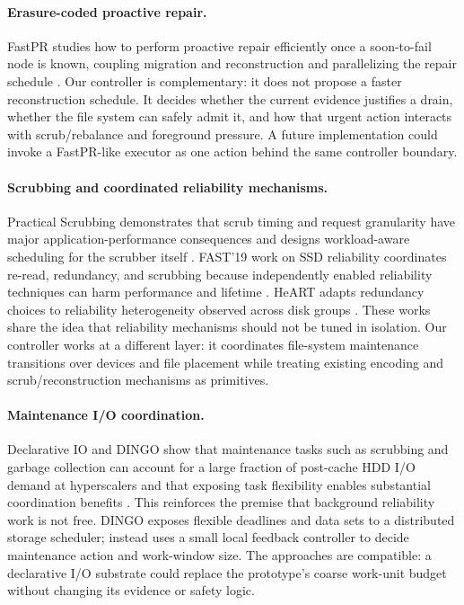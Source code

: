 \paragraph{Erasure-coded proactive repair.}
FastPR studies how to perform proactive repair efficiently once a soon-to-fail node is known, coupling migration and reconstruction and parallelizing the repair schedule \citep{li2022fastpr}. Our controller is complementary: it does not propose a faster reconstruction schedule. It decides whether the current evidence justifies a drain, whether the file system can safely admit it, and how that urgent action interacts with scrub/rebalance and foreground pressure. A future implementation could invoke a FastPR-like executor as one action behind the same controller boundary.

\paragraph{Scrubbing and coordinated reliability mechanisms.}
Practical Scrubbing demonstrates that scrub timing and request granularity have major application-performance consequences and designs workload-aware scheduling for the scrubber itself \citep{amvrosiadis2012scrubbing}. FAST'19 work on SSD reliability coordinates re-read, redundancy, and scrubbing because independently enabled reliability techniques can harm performance and lifetime \citep{kim2019ssd}. HeART adapts redundancy choices to reliability heterogeneity observed across disk groups \citep{kadekodi2019heart}. These works share the idea that reliability mechanisms should not be tuned in isolation. Our controller works at a different layer: it coordinates file-system maintenance transitions over devices and file placement while treating existing encoding and scrub/reconstruction mechanisms as primitives.

\paragraph{Maintenance I/O coordination.}
Declarative IO and DINGO show that maintenance tasks such as scrubbing and garbage collection can account for a large fraction of post-cache HDD I/O demand at hyperscalers and that exposing task flexibility enables substantial coordination benefits \citep{athlur2026declarative}. This reinforces the premise that background reliability work is not free. DINGO exposes flexible deadlines and data sets to a distributed storage scheduler; \autopilot{} instead uses a small local feedback controller to decide maintenance action and work-window size. The approaches are compatible: a declarative I/O substrate could replace the prototype's coarse work-unit budget without changing its evidence or safety logic.

